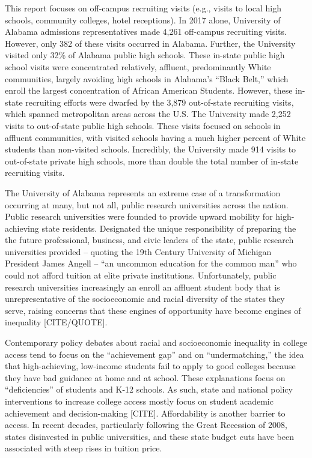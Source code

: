 \documentclass[twoside]{article}
\begin{document}
This report focuses on off-campus recruiting visits (e.g., visits to local high schools, community colleges, hotel receptions).  In 2017 alone, University of Alabama admissions representatives made 4,261 off-campus recruiting visits.  However, only 382 of these visits occurred in Alabama.  Further, the University visited only 32\% of Alabama public high schools. These in-state public high school visits were concentrated relatively, affluent, predominantly White communities, largely avoiding high schools in Alabama's ``Black Belt,'' which enroll the largest concentration of African American Students.  However, these in-state recruiting efforts were dwarfed by the 3,879 out-of-state recruiting visits, which spanned metropolitan areas across the U.S. The University made 2,252 visits to out-of-state public high schools. These visits focused on schools in affluent communities, with visited schools having a much higher percent of White students than non-visited schools.  Incredibly, the University made 914 visits to out-of-state private high schools, more than double the total number of in-state recruiting visits.

The University of Alabama represents an extreme case of a transformation occurring at many, but not all, public research universities across the nation.  Public research universities were founded to provide upward mobility for high-achieving state residents. Designated the unique responsibility of preparing the the future professional, business, and civic leaders of the state, public research universities provided -- quoting the 19th Century University of Michigan President James Angell -- ``an uncommon education for the common man'' who could not afford tuition at elite private institutions.  Unfortunately, public research universities increasingly an enroll an affluent student body that is unrepresentative of the socioeconomic and racial diversity of the states they serve, raising concerns that these engines of opportunity have become engines of inequality [CITE/QUOTE].

Contemporary policy debates about racial and socioeconomic inequality in college access tend to focus on the ``achievement gap'' and on ``undermatching,'' the idea that high-achieving, low-income students fail to apply to good colleges because they have bad guidance at home and at school.  These explanations focus on ``deficiencies'' of students and K-12 schools. As such, state and national policy interventions to increase college access mostly focus on student academic achievement and decision-making [CITE]. Affordability is another barrier to access. In recent decades, particularly following the Great Recession of 2008, states disinvested in public universities, and these state budget cuts have been associated with steep rises in tuition price. 
\end{document}

